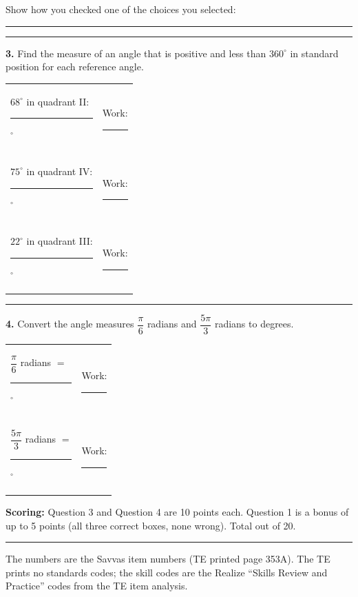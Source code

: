 \documentclass[11pt]{article}
\begin{document}
\vspace{6pt}
Show how you checked one of the choices you selected:

\vspace{4pt}\rule{\linewidth}{0.4pt}

\vspace{10pt}\noindent\rule{\textwidth}{0.4pt}

\vspace{6pt}
\textbf{3.} Find the measure of an angle that is positive and less than $360^\circ$ in standard position for each reference angle.

\vspace{8pt}
\begin{tabular}{@{}l@{\qquad}l@{}}
$68^\circ$ in quadrant II: \rule{2cm}{0.4pt}$^\circ$ & Work: \rule{6.5cm}{0.4pt}\\[14pt]
$75^\circ$ in quadrant IV: \rule{2cm}{0.4pt}$^\circ$ & Work: \rule{6.5cm}{0.4pt}\\[14pt]
$22^\circ$ in quadrant III: \rule{2cm}{0.4pt}$^\circ$ & Work: \rule{6.5cm}{0.4pt}
\end{tabular}

\vspace{10pt}\noindent\rule{\textwidth}{0.4pt}

\vspace{6pt}
\textbf{4.} Convert the angle measures $\dfrac{\pi}{6}$ radians and $\dfrac{5\pi}{3}$ radians to degrees.

\vspace{8pt}
\begin{tabular}{@{}l@{\qquad}l@{}}
$\dfrac{\pi}{6}$ radians $=$ \rule{2cm}{0.4pt}$^\circ$ & Work: \rule{6.5cm}{0.4pt}\\[18pt]
$\dfrac{5\pi}{3}$ radians $=$ \rule{2cm}{0.4pt}$^\circ$ & Work: \rule{6.5cm}{0.4pt}
\end{tabular}

\vfill
\noindent\textbf{Scoring:} Question 3 and Question 4 are 10 points each. Question 1 is a bonus of up to 5 points (all three correct boxes, none wrong). Total out of 20.

\newpage
{}

\vspace{4pt}\noindent\rule{\textwidth}{0.6pt}

The numbers are the Savvas item numbers (TE printed page 353A). The TE prints no standards codes; the skill codes are the Realize ``Skills Review and Practice'' codes from the TE item analysis.
\end{document}
